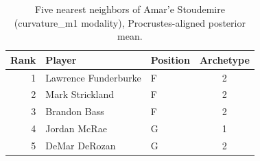 \begin{table}[htbp]
  \centering\small
  \begin{tabular}{rllc}
    \toprule
    Rank & Player & Position & Archetype \\
    \midrule
    1 & Lawrence Funderburke & F & 2 \\
    2 & Mark Strickland & F & 2 \\
    3 & Brandon Bass & F & 2 \\
    4 & Jordan McRae & G & 1 \\
    5 & DeMar DeRozan & G & 2 \\
    \bottomrule
  \end{tabular}
  \caption{Five nearest neighbors of Amar'e Stoudemire (curvature_m1 modality), Procrustes-aligned posterior mean.}
  \label{tab:Amar_e_Stoudemire_neighbors_curvature_m1}
\end{table}

